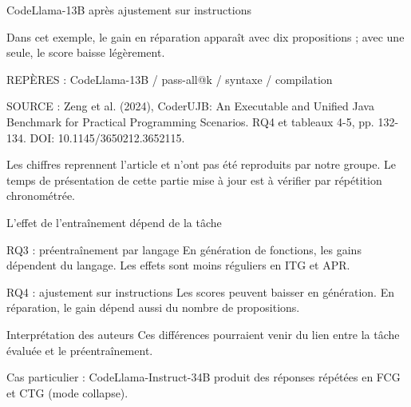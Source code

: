 \documentclass[aspectratio=169]{beamer}
\begin{document}
\begin{frame}{CodeLlama-13B après ajustement sur instructions}
{Dans cet exemple, le gain en réparation apparaît avec dix propositions ; avec une seule, le score baisse légèrement.

REPÈRES : CodeLlama-13B / pass-all@k / syntaxe / compilation

SOURCE : Zeng et al. (2024), CoderUJB: An Executable and Unified Java Benchmark for Practical Programming Scenarios. RQ4 et tableaux 4-5, pp. 132-134. DOI: 10.1145/3650212.3652115.

Les chiffres reprennent l'article et n'ont pas été reproduits par notre groupe. Le temps de présentation de cette partie mise à jour est à vérifier par répétition chronométrée.
}
\end{frame}


\begin{frame}{L’effet de l’entraînement dépend de la tâche}
\small
\begin{block}{RQ3 : préentraînement par langage}
En génération de fonctions, les gains dépendent du langage. Les effets sont moins réguliers en ITG et APR.
\end{block}
\begin{block}{RQ4 : ajustement sur instructions}
Les scores peuvent baisser en génération. En réparation, le gain dépend aussi du nombre de propositions.
\end{block}
\begin{block}{Interprétation des auteurs}
Ces différences pourraient venir du lien entre la tâche évaluée et le préentraînement.
\end{block}
\medskip
{\small Cas particulier : CodeLlama-Instruct-34B produit des réponses répétées en FCG et CTG (mode collapse).\par}

\end{frame}
\end{document}
